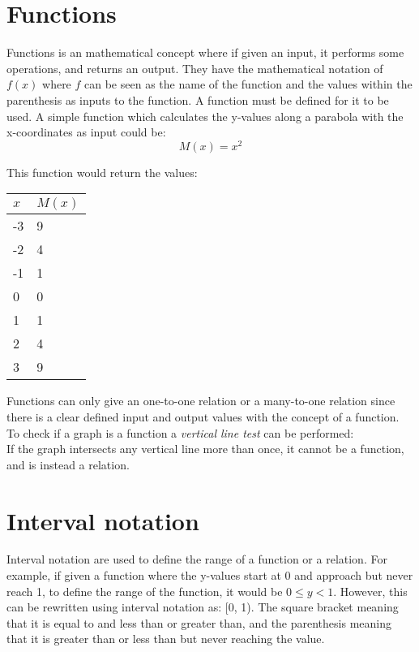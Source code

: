 \documentclass[a4paper,10pt]{report}
\begin{document}
\section{Functions}
Functions is an mathematical concept where if given an input, it performs some operations, and returns an output.  They have the mathematical notation of $f(x)$ where $f$ can be seen as the name of the function and the values within the parenthesis as inputs to the function.  A function must be defined for it to be used.  A simple function which calculates the y-values along a parabola with the x-coordinates as input could be:
$$M(x) = x^2$$

This function would return the values:
\begin{center}
	\begin{tabular}{l|l}
		$x$ & $M(x)$ \\ \hline
		-3  & 9      \\
		-2  & 4      \\
		-1  & 1      \\
		0   & 0      \\
		1   & 1      \\
		2   & 4      \\
		3   & 9
	\end{tabular}
\end{center}

Functions can only give an one-to-one relation or a many-to-one relation since there is a clear defined input and output values with the concept of a function.  To check if a graph is a function a \emph{vertical line test} can be performed:\\

If the graph intersects any vertical line more than once, it cannot be a function, and is instead a relation.

\section{Interval notation}
Interval notation are used to define the range of a function or a relation.  For example, if given a function where the y-values start at 0 and approach but never reach 1, to define the range of the function, it would be $0 \leq y < 1$.  However, this can be rewritten using interval notation as: [0, 1).  The square bracket meaning that it is equal to and less than or greater than, and the parenthesis meaning that it is greater than or less than but never reaching the value.\\
\end{document}
